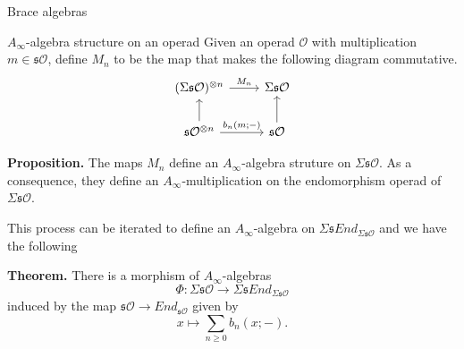 \documentclass[final]{beamer}
\newlength{\onecolwid}
\begin{document}
\begin{frame}[t]
\begin{columns}[t]
\begin{column}{\onecolwid}
\begin{block}{Brace algebras}
          \end{block}
          
          \begin{block}{$A_\infty$-algebra structure on an operad}
          Given an operad $\mathcal{O}$ with multiplication $m\in\mathfrak{s}\mathcal{O}$, define $M_n$ to be the map that makes the following diagram commutative.
          \[
         \begin{tikzcd}[ampersand replacement=\&]
(\Sigma \mathfrak{s}\mathcal{O})^{\otimes n} \arrow[r, "M_n"]  \& \Sigma \mathfrak{s}\mathcal{O} \\
\mathfrak{s}\mathcal{O}^{\otimes n} \arrow[r, "b_n(m;-)"]  \arrow[u]         \& \mathfrak{s}\mathcal{O} \arrow[u]         
\end{tikzcd}
          \]
          
          \begin{alertblock}{}
            \textbf{Proposition.} The maps $M_n$ define an $A_\infty$-algebra struture on $\Sigma\mathfrak{s}\mathcal{O}$. As a consequence, they define an $A_\infty$-multiplication on the endomorphism operad of $\Sigma\mathfrak{s}\mathcal{O}$.
          \end{alertblock}
          This process can be iterated to define an $A_\infty$-algebra on $\Sigma\mathfrak{s}End_{\Sigma\mathfrak{s}\mathcal{O}}$ and we have  the following
          
           \begin{alertblock}{}
            \textbf{Theorem.} There is a morphism of $A_\infty$-algebras \[\Phi:\Sigma\mathfrak{s}\mathcal{O}\to \Sigma\mathfrak{s}End_{\Sigma\mathfrak{s}\mathcal{O}}\]
            induced by the map $\mathfrak{s}\mathcal{O}\to End_{\mathfrak{
            s}\mathcal{O}}$ given by 
            \[x\mapsto \sum_{n\geq 0}b_n(x;-).\]
          \end{alertblock}
          \end{block}
      
          

\end{column}
\end{columns}
\end{frame}
\end{document}
